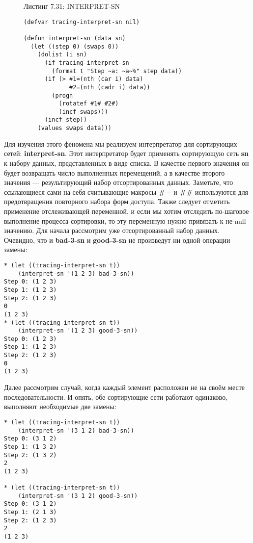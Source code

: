 \begin{figure}Листинг 7.31: INTERPRET-SN\label{listing_7.31}
\listbegin
\begin{verbatim}
(defvar tracing-interpret-sn nil)

(defun interpret-sn (data sn)
  (let ((step 0) (swaps 0))
    (dolist (i sn)
      (if tracing-interpret-sn
        (format t "Step ~a: ~a~%" step data))
      (if (> #1=(nth (car i) data)
             #2=(nth (cadr i) data))
        (progn
          (rotatef #1# #2#)
          (incf swaps)))
      (incf step))
    (values swaps data)))
\end{verbatim}
\listend
\end{figure}

Для изучения этого феномена мы реализуем интерпретатор для сортирующих сетей: \textbf{interpret-sn}. Этот интерпретатор будет применять сортирующую сеть \textbf{sn} к набору данных, представленных в виде списка. В качестве первого значения он будет возвращать число выполненных перемещений, а в качестве второго значения --- результирующий набор отсортированных данных. Заметьте, что ссылающиеся сами-на-себя считывающие макросы \textbf{\#=} и \textbf{\#\#} используются для предотвращения повторного набора форм доступа. Также следует отметить применение отслеживающей переменной, и если мы хотим отследить по-шаговое выполнение процесса сортировки, то эту переменную нужно привязать к не-null значению. Для начала рассмотрим уже отсортированный набор данных. Очевидно, что и \textbf{bad-3-sn} и \textbf{good-3-sn} не произведут ни одной операции замены:

\begin{verbatim}
* (let ((tracing-interpret-sn t))
    (interpret-sn '(1 2 3) bad-3-sn))
Step 0: (1 2 3)
Step 1: (1 2 3)
Step 2: (1 2 3)
0
(1 2 3)
* (let ((tracing-interpret-sn t))
    (interpret-sn '(1 2 3) good-3-sn))
Step 0: (1 2 3)
Step 1: (1 2 3)
Step 2: (1 2 3)
0
(1 2 3)
\end{verbatim}

Далее рассмотрим случай, когда каждый элемент расположен не на своём месте последовательности. И опять, обе сортирующие сети работают одинаково, выполняют необходимые две замены:

\begin{verbatim}
* (let ((tracing-interpret-sn t))
    (interpret-sn '(3 1 2) bad-3-sn))
Step 0: (3 1 2)
Step 1: (1 3 2)
Step 2: (1 3 2)
2
(1 2 3)

* (let ((tracing-interpret-sn t))
    (interpret-sn '(3 1 2) good-3-sn))
Step 0: (3 1 2)
Step 1: (2 1 3)
Step 2: (1 2 3)
2
(1 2 3)
\end{verbatim}

